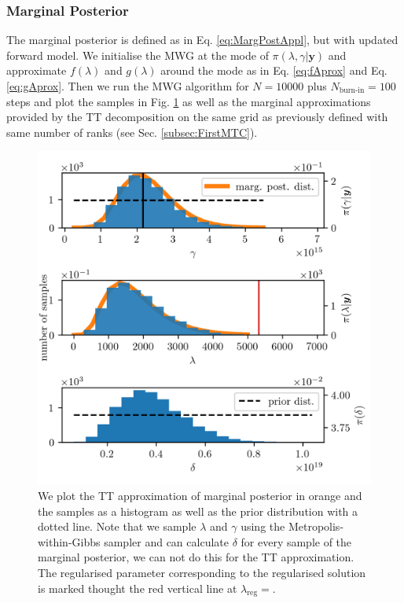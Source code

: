 \subsubsection{Marginal Posterior}
The marginal posterior is defined as in Eq. \ref{eq:MargPostAppl}, but with updated forward model.
We initialise the MWG at the mode of $\pi(\lambda,\gamma| \bm{y})$ and approximate $f(\lambda)$ and $g(\lambda)$ around the mode as in Eq. \ref{eq:fAprox} and Eq. \ref{eq:gAprox}.
Then we run the MWG algorithm for $N = 10000$ plus $N_{\text{burn-in}} = 100$ steps and plot the samples in Fig. \ref{fig:MargPostHistTT} as well as the marginal approximations provided by the TT decomposition on the same grid as previously defined with same number of ranks (see Sec. \ref{subsec:FirstMTC}).
\begin{figure}[ht!]
	\centering
	\includegraphics{secMargO3Res.png}
	\caption[Marginal posterior histograms and TT approximation as well as hyper-prior distribution.]{We plot the TT approximation of marginal posterior in orange and the samples as a histogram as well as the prior distribution with a dotted line. Note that we sample $\lambda$ and $\gamma$ using the Metropolis-within-Gibbs sampler and can calculate $\delta$ for every sample of the marginal posterior, we can not do this for the TT approximation. The regularised parameter corresponding to the regularised solution is marked thought the red vertical line at $\lambda_{\text{reg}} =$.}
	\label{fig:MargPostHistTT}
\end{figure}

